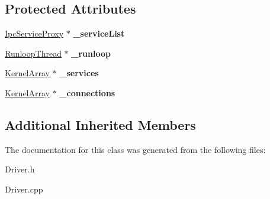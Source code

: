 \subsection*{Protected Attributes}
\begin{DoxyCompactItemize}
\item 
\mbox{\label{class_provider_driver_af3fc1b3590b59483be42792e99b29e1d}} 
\hyperlink{class_ipc_service_proxy}{Ipc\+Service\+Proxy} $\ast$ {\bfseries \+\_\+service\+List}
\item 
\mbox{\label{class_provider_driver_ac88895ce99b1fd6d7f3d151d3fbe1050}} 
\hyperlink{class_runloop_thread}{Runloop\+Thread} $\ast$ {\bfseries \+\_\+runloop}
\item 
\mbox{\label{class_provider_driver_ac293ae78ee426b000e4fa5e97c942e2f}} 
\hyperlink{class_kernel_array}{Kernel\+Array} $\ast$ {\bfseries \+\_\+services}
\item 
\mbox{\label{class_provider_driver_a02b080fcd33eb82e6b3db250678402d4}} 
\hyperlink{class_kernel_array}{Kernel\+Array} $\ast$ {\bfseries \+\_\+connections}
\end{DoxyCompactItemize}
\subsection*{Additional Inherited Members}


The documentation for this class was generated from the following files\+:\begin{DoxyCompactItemize}
\item 
Driver.\+h\item 
Driver.\+cpp\end{DoxyCompactItemize}
